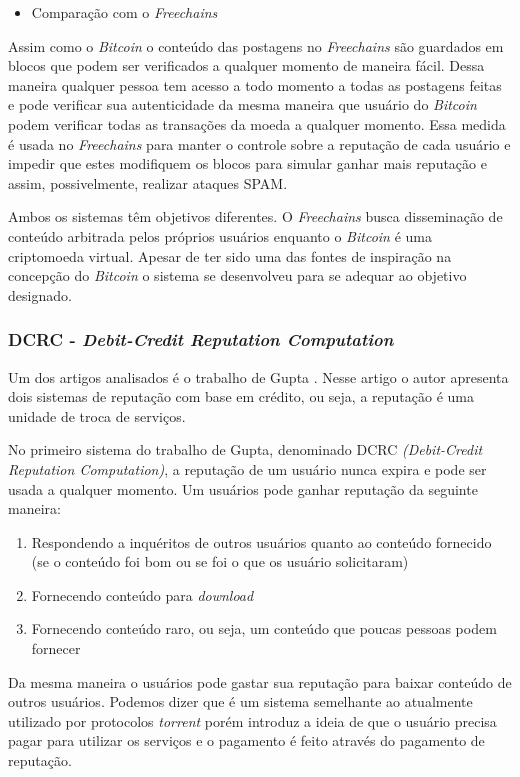 \documentclass[12pt]{article}
\newcommand{\FC} {\textit{Freechains}\xspace}
\begin{document}
\begin{itemize}
    \item Comparação com o \FC
\end{itemize}

Assim como o \textit{Bitcoin} o conteúdo das postagens no \FC são guardados em blocos que podem ser verificados a qualquer momento de maneira fácil.
Dessa maneira qualquer pessoa tem acesso a todo momento a todas as postagens feitas e pode verificar sua autenticidade da mesma maneira que usuário do \textit{Bitcoin} podem verificar todas as transações da moeda a qualquer momento.
Essa medida é usada no \FC para manter o controle sobre a reputação de cada usuário e impedir que estes modifiquem os blocos para simular ganhar mais reputação e assim, possivelmente, realizar ataques SPAM.

Ambos os sistemas têm objetivos diferentes.
O \FC busca disseminação de conteúdo arbitrada pelos próprios usuários enquanto o \textit{Bitcoin} é uma criptomoeda virtual.
Apesar de ter sido uma das fontes de inspiração na concepção do \textit{Bitcoin} o sistema se desenvolveu para se adequar ao objetivo designado.

\subsubsection{DCRC - \textit{Debit-Credit Reputation Computation}} \label{subsub:dcrc}

Um dos artigos analisados é o trabalho de Gupta \cite{gupta2003reputation}. Nesse artigo o autor apresenta dois  sistemas de reputação com base em crédito, ou seja, a reputação é uma unidade de troca de serviços. 

No primeiro sistema do trabalho de Gupta, denominado DCRC \textit{(Debit-Credit Reputation Computation)}, a reputação de um usuário nunca expira e pode ser usada a qualquer momento. 
Um usuários pode ganhar reputação da seguinte maneira: 

\begin{enumerate}
    \item Respondendo a inquéritos de outros usuários quanto ao conteúdo fornecido (se o conteúdo foi bom ou se foi o que os usuário solicitaram)
    \item Fornecendo conteúdo para \textit{download}
    \item Fornecendo conteúdo raro, ou seja, um conteúdo que poucas pessoas podem fornecer
\end{enumerate}

Da mesma maneira o usuários pode gastar sua reputação para baixar conteúdo de outros usuários.
Podemos dizer que é um sistema semelhante ao atualmente utilizado por protocolos \textit{torrent} porém introduz a ideia de que o usuário precisa pagar para utilizar os serviços e o pagamento é feito através do pagamento de reputação.
\end{document}
